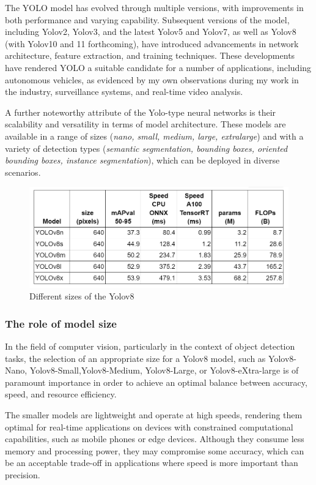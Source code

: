 The YOLO model has evolved through multiple versions, with improvements in both performance and varying capability.
Subsequent versions of the model, including Yolov2, Yolov3, and the latest Yolov5 and Yolov7, as well as Yolov8 (with Yolov10 and 11 forthcoming),
have introduced advancements in network architecture,
feature extraction, and training techniques.
These developments have rendered YOLO a suitable candidate for a number of applications,
including autonomous vehicles, as evidenced by my own observations during my work in the industry, surveillance systems, and real-time video analysis.

A further noteworthy attribute of the Yolo-type neural networks is their scalability and versatility in terms of model architecture.
These models are available in a range of sizes (\textit{nano, small, medium, large, extralarge}) and with a variety of detection types (\textit{semantic segmentation, bounding boxes,
oriented bounding boxes, instance segmentation}), which can be deployed in diverse scenarios.




\begin{figure}[ht]
\includegraphics[width=1.0\textwidth]{figures/table1}
\caption{Different sizes of the Yolov8~\cite{githubGitHubUltralyticsultralytics}}
\label{fig:tableofsizes}
\end{figure}
\newpage
\subsubsection{The role of model size}\label{subsubsec:model-size}
In the field of computer vision, particularly in the context of object detection tasks, the selection of an appropriate size for a
Yolov8 model, such as Yolov8-Nano, Yolov8-Small,Yolov8-Medium,  Yolov8-Large, or Yolov8-eXtra-large is of paramount importance in order to achieve an optimal balance between accuracy, speed, and resource efficiency.

The smaller models are lightweight and operate at high speeds, rendering them optimal for real-time applications on devices with constrained computational capabiliti\-es, such as mobile phones or edge devices.
Although they consume less memory and processing power, they may compromise some accuracy, which can be an ac\-cept\-ab\-le trade-off in applications where speed is more important than precision.

